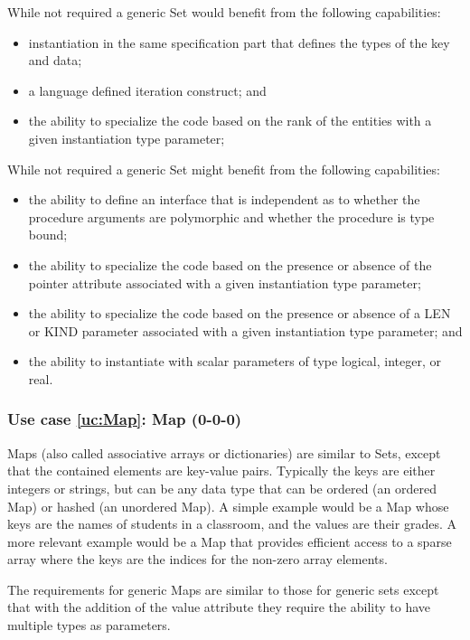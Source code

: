 \documentclass{article}
\newcounter{usecase}
\newcounter{requirement}
\newcommand{\newusecase}[2]{
\refstepcounter{usecase}\label{uc:#1}
\subsubsection{Use case \ref{uc:#1}: #1 (#2)}}
\begin{document}
While not required a generic Set would benefit from the following
capabilities:
\begin{itemize}

\item instantiation in the same specification part that defines the types
  of the key and data;

\item a language defined iteration construct; and

\item the ability to specialize the code based on the rank of the entities
  with a given instantiation type parameter;
\end{itemize}
While not required a generic Set might benefit from the following
capabilities:
\begin{itemize}
\item the ability to define an interface that is independent as to whether 
  the procedure arguments are polymorphic and whether the procedure is
  type bound; 

\item the ability to specialize the code based on the presence or absence
  of the pointer attribute associated with a given instantiation type
  parameter;

\item the ability to specialize the code based on the presence or absence
  of a LEN or KIND parameter associated with a given instantiation
  type parameter; and

\item the ability to instantiate with scalar parameters of type logical,
  integer, or real.
\end{itemize}

\newusecase{Map}{0-0-0} 
Maps (also called associative arrays or dictionaries) are similar to
Sets, except that the contained elements
are key-value pairs.  Typically the keys are either integers or
strings, but can be any data type that can be ordered (an ordered Map)
or hashed (an unordered Map).  A simple example would be a Map whose
keys are the names of students in a classroom, and the values are
their grades.  A more relevant example would be a Map that provides
efficient access to a sparse array where the keys are the indices for
the non-zero array elements.

The requirements for generic Maps are similar to those for generic
sets except that with the addition of the value attribute they
require the ability to have multiple types as parameters.
\end{document}
